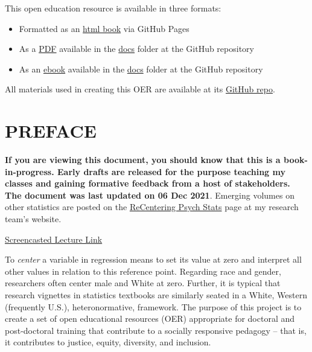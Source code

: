 \documentclass[
]{book}
\providecommand{\tightlist}{%
  \setlength{\itemsep}{0pt}\setlength{\parskip}{0pt}}
\begin{document}
This open education resource is available in three formats:

\begin{itemize}
\tightlist
\item
  Formatted as an \href{https://lhbikos.github.io/extRas/}{html book} via GitHub Pages
\item
  As a \href{https://github.com/lhbikos/extRas/blob/main/docs/ReC_extRas.pdf}{PDF} available in the \href{https://github.com/lhbikos/extRas/tree/main/docs}{docs} folder at the GitHub repository
\item
  As an \href{https://github.com/lhbikos/extRas/blob/main/docs/ReC_extRas.epub}{ebook} available in the \href{https://github.com/lhbikos/extRas/tree/main/docs}{docs} folder at the GitHub repository
\end{itemize}

All materials used in creating this OER are available at its \href{https://github.com/lhbikos/extRas}{GitHub repo}.

\hypertarget{preface}{%
\chapter*{PREFACE}\label{preface}}

\textbf{If you are viewing this document, you should know that this is a book-in-progress. Early drafts are released for the purpose teaching my classes and gaining formative feedback from a host of stakeholders. The document was last updated on 06 Dec 2021}. Emerging volumes on other statistics are posted on the \href{https://lhbikos.github.io/BikosRVT/ReCenter.html}{ReCentering Psych Stats} page at my research team's website.

\href{https://spu.hosted.panopto.com/Panopto/Pages/Viewer.aspx?id=c932455e-ef06-444a-bdca-acf7012d759a}{Screencasted Lecture Link}

To \emph{center} a variable in regression means to set its value at zero and interpret all other values in relation to this reference point. Regarding race and gender, researchers often center male and White at zero. Further, it is typical that research vignettes in statistics textbooks are similarly seated in a White, Western (frequently U.S.), heteronormative, framework. The purpose of this project is to create a set of open educational resources (OER) appropriate for doctoral and post-doctoral training that contribute to a socially responsive pedagogy -- that is, it contributes to justice, equity, diversity, and inclusion.
\end{document}

